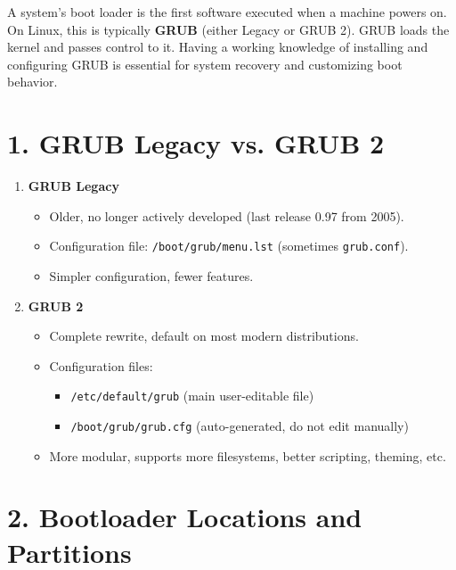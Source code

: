 \documentclass[a4paper]{report}
\begin{document}
A system’s boot loader is the first software executed when a machine powers on. On Linux, this is typically \textbf{GRUB} (either Legacy or GRUB 2). GRUB loads the kernel and passes control to it. Having a working knowledge of installing and configuring GRUB is essential for system recovery and customizing boot behavior.

\section*{1. GRUB Legacy vs. GRUB 2}

\begin{enumerate}
    \item \textbf{GRUB Legacy}
    \begin{itemize}
        \item Older, no longer actively developed (last release 0.97 from 2005).
        \item Configuration file: \texttt{/boot/grub/menu.lst} (sometimes \texttt{grub.conf}).
        \item Simpler configuration, fewer features.
    \end{itemize}

    \item \textbf{GRUB 2}
    \begin{itemize}
        \item Complete rewrite, default on most modern distributions.
        \item Configuration files:
        \begin{itemize}
            \item \texttt{/etc/default/grub} (main user-editable file)
            \item \texttt{/boot/grub/grub.cfg} (auto-generated, do not edit manually)
        \end{itemize}
        \item More modular, supports more filesystems, better scripting, theming, etc.
    \end{itemize}
\end{enumerate}

\section*{2. Bootloader Locations and Partitions}
\end{document}
